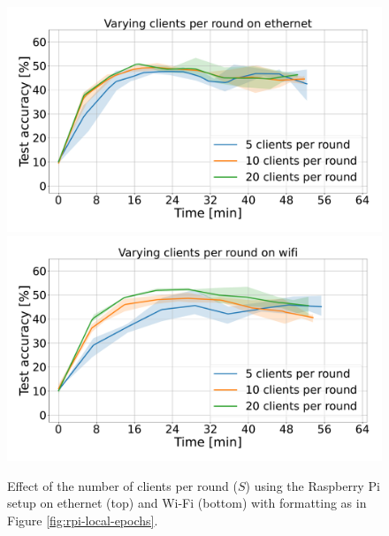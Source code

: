 \documentclass{article}
\begin{document}
    \begin{figure}[htb!]
    \centering
    \includegraphics[width=\linewidth]{imgs/time_avg_clients_per_round_ethernet.pdf}
    \includegraphics[width=\linewidth]{imgs/time_avg_clients_per_round_wifi.pdf}
    \caption{Effect of the number of clients per round ($S$) using the Raspberry Pi setup on ethernet (top) and Wi-Fi (bottom) with formatting as in Figure \ref{fig:rpi-local-epochs}.}
    \label{fig:rpi-clients-per-round}
\end{figure}\noindent
\end{document}
